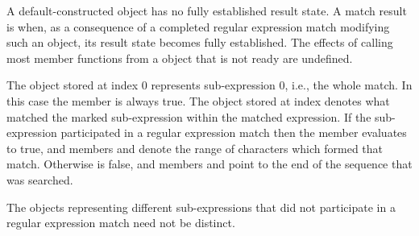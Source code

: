 \pnum
A default-constructed  object has no fully established result state. A
match result is  when, as a consequence of a completed regular expression match
modifying such an object, its result state becomes fully established. The effects of calling
most member functions from a  object that is not ready are undefined.

\pnum
{}%
The  object stored at index 0 represents sub-expression 0,
i.e., the whole match. In this case the  member
 is always true. The 
object stored at index  denotes what matched the marked
sub-expression  within the matched expression. If the
sub-expression  participated in a regular expression 
match then the  member  evaluates to true, and
members  and  denote the range of characters
 which formed that
match. Otherwise  is false, and members 
and  point to the end of the sequence 
that was searched. \begin{note} The  objects representing
different sub-expressions that did not participate in a regular expression
match need not be distinct.\end{note}

